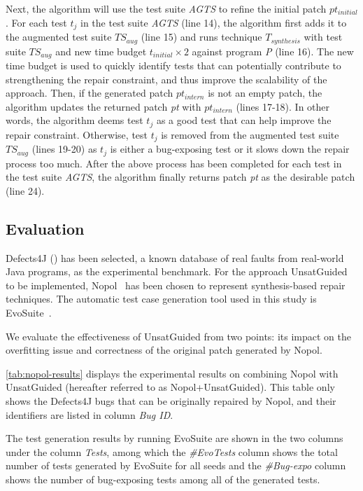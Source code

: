 Next, the algorithm will use the test suite \emph{AGTS} to refine the initial patch $pt_{initial}$. 
For each test $t_j$ in the test suite \emph{AGTS} (line 14), the algorithm first adds it to the augmented test suite $TS_{aug}$ (line 15) and runs technique $T_{synthesis}$ with test suite $TS_{aug}$ and new time budget $t_{initial} \times 2$ against program \emph{P} (line 16).
The new time budget is used to quickly identify tests that can potentially contribute to strengthening the repair constraint, and thus improve the scalability of the approach. 
Then, if the generated patch $pt_{intern}$ is not an empty patch, the algorithm updates the returned patch \emph{pt} with $pt_{intern}$ (lines 17-18). 
In other words, the algorithm deems test $t_j$ as a good test that can help improve the repair constraint. 
Otherwise, test $t_j$ is removed from the augmented test suite $TS_{aug}$ (lines 19-20) as $t_j$ is either a bug-exposing test or it slows down the repair process too much. 
After the above process has been completed for each test in the test suite \emph{AGTS}, the algorithm finally returns patch \emph{pt} as the desirable patch (line 24). 

\subsection{Evaluation}
\label{subsec:transversal-contributions:test-for-repair:evaluations}

Defects4J (\cite{JustJE2014}) has been selected, a known database of real faults from real-world Java programs, as the experimental benchmark.
For the approach UnsatGuided to be implemented, Nopol~\cite{nopol} has been chosen to represent synthesis-based repair techniques. 
The automatic test case generation tool used in this study is EvoSuite~\cite{ESECFSE11}.

We evaluate the effectiveness of UnsatGuided from two points: its impact on the overfitting issue and correctness of the original patch generated by Nopol.

\autoref{tab:nopol-results} displays the experimental results on combining Nopol with UnsatGuided (hereafter referred to as Nopol+\-Unsat\-Guided).
This table only shows the Defects4J bugs that can be originally repaired by Nopol, and their identifiers are listed in column \emph{Bug ID}. 

The test generation results by running EvoSuite are shown in the two columns under the column \emph{Tests}, among which the \emph{\#EvoTests} column shows the total number of tests generated by EvoSuite for all seeds and the \emph{\#Bug-expo} column shows the number of bug-exposing tests among all of the generated tests. 

